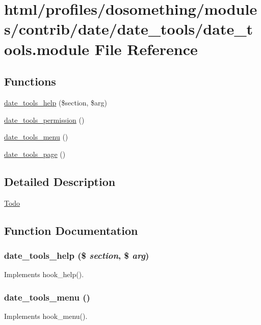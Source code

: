 \hypertarget{date__tools_8module}{
\section{html/profiles/dosomething/modules/contrib/date/date\_\-tools/date\_\-tools.module File Reference}
\label{date__tools_8module}
}
\subsection*{Functions}
\begin{DoxyCompactItemize}
\item 
\hyperlink{date__tools_8module_a3a987dd4bcf123ce3578e7510566f026}{date\_\-tools\_\-help} (\$section, \$arg)
\item 
\hyperlink{date__tools_8module_ac007e8a645addfc1c9b043f085b4cf02}{date\_\-tools\_\-permission} ()
\item 
\hyperlink{date__tools_8module_aedbe49d3794ad882e2cd8482ee7498b1}{date\_\-tools\_\-menu} ()
\item 
\hyperlink{date__tools_8module_a5207aac2d00ede5fa29257410b3fb68d}{date\_\-tools\_\-page} ()
\end{DoxyCompactItemize}


\subsection{Detailed Description}
\begin{Desc}
\item[\hyperlink{todo__todo000025}{Todo}]\end{Desc}


\subsection{Function Documentation}
\hypertarget{date__tools_8module_a3a987dd4bcf123ce3578e7510566f026}{
\subsubsection[{date\_\-tools\_\-help}]{\setlength{\rightskip}{0pt plus 5cm}date\_\-tools\_\-help (\$ {\em section}, \/  \$ {\em arg})}}
\label{date__tools_8module_a3a987dd4bcf123ce3578e7510566f026}
Implements hook\_\-help(). \hypertarget{date__tools_8module_aedbe49d3794ad882e2cd8482ee7498b1}{
\subsubsection[{date\_\-tools\_\-menu}]{\setlength{\rightskip}{0pt plus 5cm}date\_\-tools\_\-menu ()}}
\label{date__tools_8module_aedbe49d3794ad882e2cd8482ee7498b1}
Implements hook\_\-menu(). 

